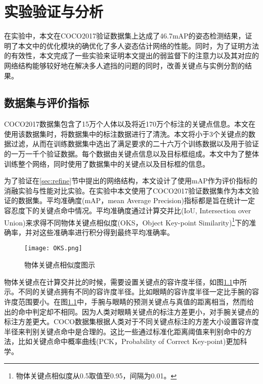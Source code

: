\chapter{实验验证与分析}
\label{cha:exp}
在实验中，本文在COCO2017验证数据集上达成了46.7mAP的姿态检测结果，证明了本文中的优化模块的确优化了多人姿态估计网络的性能。同时，为了证明方法的有效性，本文完成了一些实验来证明本文提出的弱监督下的注意力以及其对应的网络结构能够较好地在解决多人遮挡的问题的同时，改善关键点与实例分割的结果。
\section{数据集与评价指标}
\label{sec:dataset}
COCO2017数据集包含了15万个人体以及将近170万个标注的关键点信息。本文在使用该数据集时，将数据集中的标注数据进行了清洗。本文将小于3个关键点的数据过滤，从而在训练数据集中选出了满足要求的二十六万个训练数据以及用于验证的一万一千个验证数据。每个数据由关键点信息以及目标框组成。本文中为了整体训练整个网络，同时使用了数据集中的关键点以及目标框的信息。

为了验证在\ref{sec:refine}节中提出的网络结构，本文设计了使用mAP作为评价指标的消融实验与性能对比实验。在实验中本文使用了COCO2017验证数据集\cite{lin2014microsoft}作为本文验证的数据集。平均准确度(mAP，mean Average Precision)\cite{zhu2004recall}指标都是旨在统计一定容忍度下的关键点命中情况。平均准确度通过计算交并比(IoU, Intersection over Union)来求得不同物体关键点相似度(OKS，Object Key-point Similarity)\footnote{物体关键点相似度从0.5取值至0.95，间隔为0.01。}下的准确率，并对这些准确率进行积分得到最终平均准确率。

\begin{figure}
	\centering
	\texttt{[image: OKS.png]}
	\caption{物体关键点相似度图示\cite{ruggero2017benchmarking}}
	\label{fig:oksfigure}
\end{figure}

物体关键点在计算交并比的时候，需要设置关键点的容许度半径，如图\ref{fig:oksfigure}中所示。不同的关键点拥有不同的容许度半径。比如眼睛的容许度半径一定比手腕的容许度范围要小。在图\ref{fig:oksfigure}中，手腕与眼睛的预测关键点与真值的距离相当，然而给出的命中判定却不相同。因为人类对眼睛关键点的标注方差更小，对手腕关键点的标注方差更大。COCO数据集根据人类对于不同关键点标注的方差大小设置容许度半径来判别关键点命中是合理的。这比一些通过标准化距离阈值来判别命中的方法，比如关键点命中概率曲线\cite{andriluka20142d}(PCK，Probability of Correct Key-point)更加科学。

